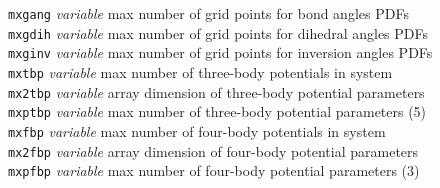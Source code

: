 \begin{tabbing}
\> {\tt mxgang}      \> {\em variable}       \> max number of grid points for bond angles PDFs \\
\> {\tt mxgdih}      \> {\em variable}       \> max number of grid points for dihedral angles PDFs \\
\> {\tt mxginv}      \> {\em variable}       \> max number of grid points for inversion angles PDFs \\
\> {\tt mxtbp}       \> {\em variable}       \> max number of three-body potentials in system \\
\> {\tt mx2tbp}      \> {\em variable}       \> array dimension of three-body potential parameters \\
\> {\tt mxptbp}      \> {\em variable}       \> max number of three-body potential parameters (5) \\
\> {\tt mxfbp}       \> {\em variable}       \> max number of four-body potentials in system \\
\> {\tt mx2fbp}      \> {\em variable}       \> array dimension of four-body potential parameters \\
\> {\tt mxpfbp}      \> {\em variable}       \> max number of four-body potential parameters (3) \\


\end{tabbing}

